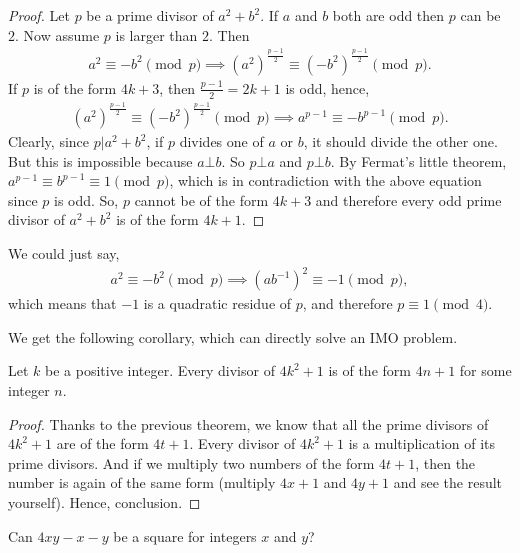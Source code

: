 \documentclass[12pt]{subfile}
\begin{document}
	\begin{proof}
		Let $p$ be a prime divisor of $a^2+b^2$. If $a$ and $b$ both are odd then $p$ can be $2$. Now assume $p$ is larger than $2$. Then
			\begin{align*}
				a^2  \equiv-b^2 \pmod p\implies \left(a^2\right)^{\frac{p-1}{2}} \equiv \left(-b^2\right)^{\frac{p-1}{2}}\pmod p.
			\end{align*}
		If $p$ is of the form $4k+3$, then $\frac{p-1}{2}=2k+1$ is odd, hence,
			\begin{align*}
			\left(a^2\right)^{\frac{p-1}{2}} \equiv \left(-b^2\right)^{\frac{p-1}{2}}\pmod p \implies a^{p-1} \equiv -b^{p-1} \pmod p.
			\end{align*}
		Clearly, since $p|a^2+b^2$, if $p$ divides one of $a$ or $b$, it should divide the other one. But this is impossible because $a \bot b$. So $p \bot a$ and $p \bot b$. By Fermat's little theorem, $a^{p-1} \equiv b^{p-1} \equiv 1 \pmod p$, which is in contradiction with the above equation since $p$ is odd.
		So, $p$ cannot be of the form $4k+3$ and therefore every odd prime divisor of $a^2+b^2$ is of the form $4k+1$.
	\end{proof}
	
	\begin{note}
	We could just say,
			\begin{align*}
				a^2  \equiv-b^2\pmod p \implies (ab^{-1})^2 \equiv-1\pmod p,
			\end{align*}
		which means that $-1$ is a quadratic residue of $p$, and therefore $p\equiv1\pmod4$.
	\end{note}
We get the following corollary, which can directly solve an IMO problem.
	\begin{corollary}\label{cor:4n+1}
		Let $k$ be a positive integer. Every divisor of $4k^2+1$ is of the form $4n+1$ for some integer $n$.
	\end{corollary}
	
	\begin{proof}
		Thanks to the previous theorem, we know that all the prime divisors of $4k^2+1$ are of the form $4t+1$. Every divisor of $4k^2+1$ is a multiplication of its prime divisors. And if we multiply two numbers of the form $4t+1$, then the number is again of the same form (multiply $4x+1$ and $4y+1$ and see the result yourself). Hence, conclusion.
	\end{proof}
	
	\begin{problem}
		Can $4xy-x-y$ be a square for integers $x$ and $y$?
	\end{problem}
	
\end{document}
